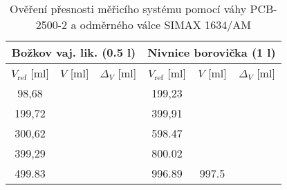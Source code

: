 

\begin{table}[h]
    \centering
    \begin{tabular}{|c|c|c|c|c|c|}
        \hline
        \multicolumn{3}{|c|}{Božkov vaj. lik. (0.5 l)} & \multicolumn{3}{c|}{Nivnice borovička (1 l)} \\ \hline
        $V_{\text{ref}}$ [ml] & $V$ [ml] & $\Delta_V$ [ml] & $V_{\text{ref}}$ [ml] & $V$ [ml] & $\Delta_V$ [ml] \\ \hline \hline
        98,68 & & & 199,23 & & \\ \hline
        199,72 & & & 399,91 & & \\ \hline
        300,62 & & & 598.47 & & \\ \hline
        399,29 & & & 800.02 & & \\ \hline
        499.83 & & & 996.89 & 997.5 & \\ \hline
    \end{tabular}
    \caption{Ověření přesnosti měřicího systému pomocí váhy PCB-2500-2 a odměrného válce SIMAX 1634/AM}
    \label{tab:měření objemu}
\end{table}